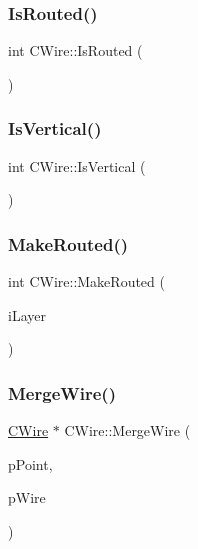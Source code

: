 \mbox{\label{classCWire_a8edc31661e3d037da712ad64cd7b8b5b}} 
\subsubsection{\texorpdfstring{IsRouted()}{IsRouted()}}
{\footnotesize\ttfamily int C\+Wire\+::\+Is\+Routed (\begin{DoxyParamCaption}{ }\end{DoxyParamCaption})\hspace{0.3cm}{\ttfamily [inline]}}

\mbox{\label{classCWire_a5459f08bfd3912aae672915a05bcfb38}} 
\subsubsection{\texorpdfstring{IsVertical()}{IsVertical()}}
{\footnotesize\ttfamily int C\+Wire\+::\+Is\+Vertical (\begin{DoxyParamCaption}{ }\end{DoxyParamCaption})}

\mbox{\label{classCWire_a89b640e7c8363910006273372e84effa}} 
\subsubsection{\texorpdfstring{MakeRouted()}{MakeRouted()}}
{\footnotesize\ttfamily int C\+Wire\+::\+Make\+Routed (\begin{DoxyParamCaption}\item[{int}]{i\+Layer }\end{DoxyParamCaption})}

\mbox{\label{classCWire_ac285ab926f7318d97773bbf31e00d4be}} 
\subsubsection{\texorpdfstring{MergeWire()}{MergeWire()}}
{\footnotesize\ttfamily \mbox{\hyperlink{classCWire}{C\+Wire}} $\ast$ C\+Wire\+::\+Merge\+Wire (\begin{DoxyParamCaption}\item[{\mbox{\hyperlink{classCPoint}{C\+Point}} $\ast$}]{p\+Point,  }\item[{\mbox{\hyperlink{classCWire}{C\+Wire}} $\ast$}]{p\+Wire }\end{DoxyParamCaption})}

